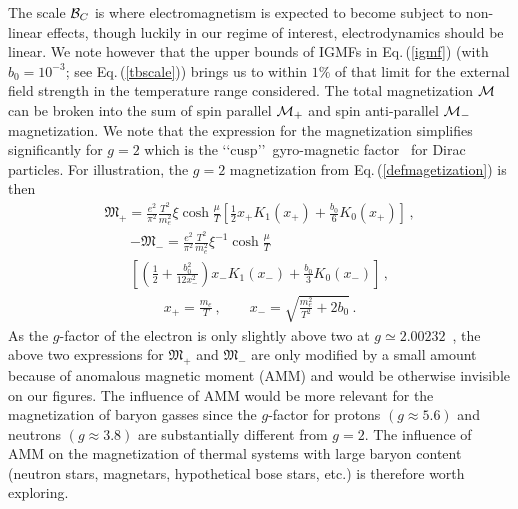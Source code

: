 \documentclass[reprint]{revtex4-2}
\newcommand{\req}[1]{Eq.\,(\ref{#1})}
\begin{document}
The scale ${\cal B}_{C}$ is where electromagnetism is expected to become subject to non-linear effects, though luckily in our regime of interest, electrodynamics should be linear. We note however that the upper bounds of IGMFs in \req{igmf} (with $b_{0}=10^{-3}$; see \req{tbscale}) brings us to within $1\%$ of that limit for the external field strength in the temperature range considered. The total magnetization ${\cal M}$ can be broken into the sum of spin parallel ${\cal M}_{+}$ and spin anti-parallel ${\cal M}_{-}$ magnetization. We note that the expression for the magnetization simplifies significantly for $g=2$ which is the \lq\lq cusp\rq\rq\ gyro-magnetic factor~\cite{rafelski2022study} for Dirac particles. For illustration, the $g=2$ magnetization from \req{defmagetization} is then
\begin{align}
    \label{g2magplus}
    {\mathfrak M}_{+}=\frac{e^{2}}{\pi^{2}}\frac{T^{2}}{m_{e}^{2}}\xi\cosh{\frac{\mu}{T}}\left[\frac{1}{2}x_{+}K_{1}(x_{+})+\frac{b_{0}}{6}K_{0}(x_{+})\right]\,,
\end{align}
\begin{multline}        
    \label{g2magminus}
    -{\mathfrak M}_{-}=\frac{e^{2}}{\pi^{2}}\frac{T^{2}}{m_{e}^{2}}\xi^{-1}\cosh{\frac{\mu}{T}}\\
    \left[\left(\frac{1}{2}+\frac{b_{0}^{2}}{12x_{-}^{2}}\right)x_{-}K_{1}(x_{-})+\frac{b_{0}}{3}K_{0}(x_{-})\right]\,,
\end{multline}
\begin{align}
    x_{+}=\frac{m_{e}}{T}\,,\qquad
    x_{-}=\sqrt{\frac{m_{e}^{2}}{T^{2}}+2b_{0}}\,.
\end{align}
As the $g$-factor of the electron is only slightly above two at $g\simeq2.00232$~\cite{tiesinga2021codata}, the above two expressions for ${\mathfrak M}_{+}$ and ${\mathfrak M}_{-}$ are only modified by a small amount because of anomalous magnetic moment (AMM) and would be otherwise invisible on our figures. The influence of AMM would be more relevant for the magnetization of baryon gasses since the $g$-factor for protons $(g\approx5.6)$ and neutrons $(g\approx3.8)$ are substantially different from $g=2$. The influence of AMM on the magnetization of thermal systems with large baryon content (neutron stars, magnetars, hypothetical bose stars, etc.) is therefore worth exploring.
\end{document}
